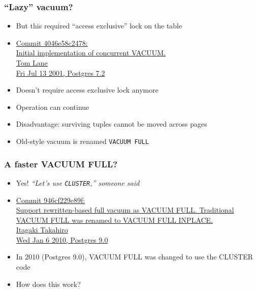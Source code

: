\begin{frame}
  \frametitle{``Lazy'' vacuum?}
  \begin{itemize}
    \item But this required ``access exclusive'' lock on the table
    \item {\linksize \href{https://git.postgresql.org/cgit/postgresql.git/commit/?id=4046e58c2478cfcdd4334e2c282b5a42f047ea0b}
      {Commit 4046e58c2478: \faExternalLink \\
      Initial implementation of concurrent VACUUM. \\
      Tom Lane \\
      Fri Jul 13 2001, Postgres 7.2}}
    \item Doesn't require access exclusive lock anymore
    \item Operation can continue
    \item Disadvantage: surviving tuples cannot be moved across pages
    \item Old-style vacuum is renamed \texttt{VACUUM FULL}
  \end{itemize}
\end{frame}

%

\begin{frame}
  \frametitle{A faster VACUUM FULL?}
  \begin{itemize}

    \item Yes! \emph{``Let's use \texttt{CLUSTER},'' someone said}
    \item {\linksize \href{https://git.postgresql.org/cgit/postgresql.git/commit/?id=946cf229e89fda779161d707f3ba1f4d3cd024a1}
      {Commit 946cf229e89f: \faExternalLink \\
      Support rewritten-based full vacuum as VACUUM FULL. Traditional VACUUM FULL was renamed to VACUUM FULL INPLACE. \\
      Itagaki Takahiro \\
      Wed Jan 6 2010, Postgres 9.0}}

    \item In 2010 (Postgres 9.0), VACUUM FULL was changed to use the CLUSTER code
    \item How does this work?
  \end{itemize}
\end{frame}

